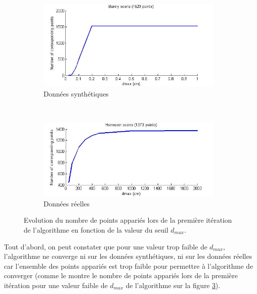 \begin{figure}[!h]
   \centering
   \begin{subfigure}[t]{.5\linewidth}
     \centering
     \includegraphics[scale=0.4]{Images/Resultats/bunny_size_subset_dmax.jpg}
     \caption{Données synthétiques}
     \label{fig:subset_dmax_synthe}
   \end{subfigure}%
   ~
   \begin{subfigure}[t]{.5\linewidth}
     \centering
     \includegraphics[scale=0.4]{Images/Resultats/hannover_size_subset_dmax.jpg}
     \caption{Données réelles}
     \label{fig:subset_dmax_reelle}
   \end{subfigure}
   
   \caption{Evolution du nombre de points appariés lors de la première itération de l'algorithme en fonction de la valeur du seuil $d_{max}$.}
   \label{fig:subset_dmax}
\end{figure}

Tout d'abord, on peut constater que pour une valeur trop faible de $d_{max}$, l'algorithme ne converge ni sur les données synthétiques, ni sur les données réelles car l'ensemble des points appariés est trop faible pour permettre à l'algorithme de converger (comme le montre le nombre de points appariés lors de la première itération pour une valeur faible de $d_{max}$ de l'algorithme sur la figure \ref{fig:subset_dmax}).

